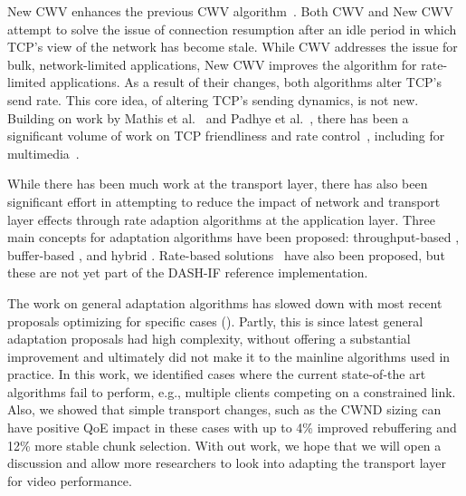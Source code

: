 \documentclass[10pt,sigconf,anonymous]{acmart}
\begin{document}
New CWV enhances the previous CWV algorithm~\cite{rfc2861-2000-padhye-congestion-window-validation}. Both CWV and New CWV attempt to solve the issue of connection resumption after an idle period in which TCP's view of the network has become stale. While CWV addresses the issue for bulk, network-limited applications, New CWV improves the algorithm for rate-limited applications. As a result of their changes, both algorithms alter TCP's send rate. This core idea, of altering TCP's sending dynamics, is not new. Building on work by Mathis et al.~\cite{Mathis-1997-the-macroscopic-behavior-tcp} and Padhye et al.~\cite{Padhye-1998-modelling-tcp-throughput}, there has been a significant volume of work on TCP friendliness and rate control~\cite{rfc-5348-tfrc,Rossi-2010-ledbat,Arun-2018-copa}, including for multimedia~\cite{Carlucci-2016-Analysis-WebRTC,Choi-2007-fairer-tfrc}.

While there has been much work at the transport layer, there has also been significant effort in attempting to reduce the impact of network and transport layer effects through rate adaption algorithms at the application layer. Three main concepts for adaptation algorithms have been proposed: throughput-based \cite{Sun-2016-cs2p, Jiang-2012-improving-fairness-http-video-festive}, buffer-based \cite{Spiteri-2016-BOLA,Huang-2015-A-buffer-based-approach-to-rate-adaptation-bba}, and hybrid \cite{Spiteri-2019-from-theory-to-practice-sabre,Wang-2016-squad}. Rate-based solutions~\cite{Li-2014-probe-and-adapt-panda,Liu-2011-rate-adaptation} have also been proposed, but these are not yet part of the DASH-IF reference implementation.


The work on general adaptation algorithms has slowed down with most recent proposals optimizing for specific cases (\cite{Karagkioules-2020-achieving-low-latency}). Partly, this is since latest general adaptation proposals had high complexity, without offering a substantial improvement \cite{Yin-2015-a-control-theoritic-approach} and ultimately did not make it to the mainline algorithms used in practice. In this work, we identified cases where the current state-of-the art algorithms fail to perform, e.g., multiple clients competing on a constrained link. Also, we showed that simple transport changes, such as the CWND sizing can have positive QoE impact in these cases with up to 4\% improved rebuffering and 12\% more stable chunk selection. With out work, we hope that we will open a discussion and allow more researchers to look into adapting the transport layer for video performance.
\end{document}
